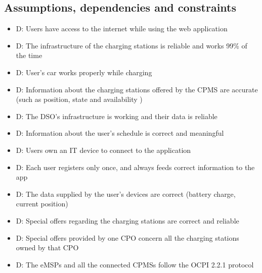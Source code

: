 \documentclass[table, 12pt]{article} %
\begin{document}
    \subsection{Assumptions, dependencies and constraints}
    \begin{itemize}
        \item {}D: Users have access to the internet while using the web application
        \item {}D: The infrastructure of the charging stations is reliable and works 99\% of the time
        \item {}D: User's car works properly while charging
        \item {}D: Information about the charging stations offered by the CPMS are accurate (such as position, state and availability )
        \item {}D: The DSO's infrastructure is working and their data is reliable 
        \item {}D: Information about the user's schedule is correct and meaningful
        \item {}D: Users own an IT device to connect to the application
        \item {}D: Each user registers only once, and always feeds correct information to the app     
        \item {}D: The data supplied by the user's devices are correct (battery charge, current position)
        \item {}D: Special offers regarding the charging stations are correct and reliable
        \item {}D: Special offers provided by one CPO concern all the charging stations owned by that CPO
        \item {}D: The eMSPs and all the connected CPMSs follow the OCPI 2.2.1 protocol
       \end{itemize}
\end{document}
